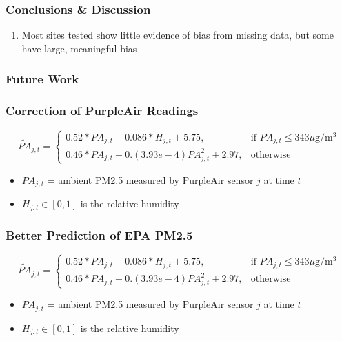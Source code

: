 \documentclass{beamer}
\begin{document}
\begin{frame}
\frametitle{Conclusions \& Discussion}
\begin{enumerate}
    \item Most sites tested show little evidence of bias from missing data, but some have large, meaningful bias
\end{enumerate}
\end{frame}


\begin{frame}
\frametitle{Future Work}
\end{frame}


\begin{frame}
\frametitle{Correction of PurpleAir Readings}
$$
\widetilde{PA}_{j,t}=\begin{cases}
			0.52*PA_{j,t} - 0.086*H_{j,t} + 5.75, & \text{if $PA_{j,t} \leq 343 \mu$g/m$^3$}\\
            0.46*PA_{j,t} + 0.(3.93e-4)PA_{j,t}^2 + 2.97, & \text{otherwise}
		 \end{cases}
$$
\begin{itemize}
    \item $PA_{j,t}$ = ambient PM2.5 measured by PurpleAir sensor $j$ at time $t$
    \item $H_{j,t}\in[0,1]$ is the relative humidity
\end{itemize}
\end{frame}


\begin{frame}
\frametitle{Better Prediction of EPA PM2.5}

$$
\widetilde{PA}_{j,t}=\begin{cases}
			0.52*PA_{j,t} - 0.086*H_{j,t} + 5.75, & \text{if $PA_{j,t} \leq 343 \mu$g/m$^3$}\\
            0.46*PA_{j,t} + 0.(3.93e-4)PA_{j,t}^2 + 2.97, & \text{otherwise}
		 \end{cases}
$$
\begin{itemize}
    \item $PA_{j,t}$ = ambient PM2.5 measured by PurpleAir sensor $j$ at time $t$
    \item $H_{j,t}\in[0,1]$ is the relative humidity
\end{itemize}
\end{frame}
\end{document}
